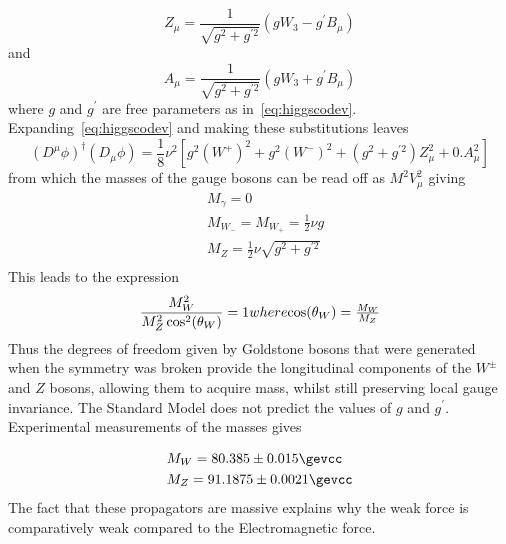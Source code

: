 \begin{equation}
  Z_{\mu} = \frac{1}{\sqrt{g^{2}+g^{\prime 2}}} (gW_{3} - g^{\prime}B_{\mu})
\end{equation}
 and
 \begin{equation}
  A_{\mu} = \frac{1}{\sqrt{g^{2}+g^{\prime 2}}} (gW_{3} + g^{\prime}B_{\mu})
\end{equation}
 where $g$ and $g^{\prime}$ are free parameters as in~\autoref{eq:higgscodev}. Expanding~\autoref{eq:higgscodev} and making these substitutions leaves
\begin{equation}
  (D^{\mu}\phi)^\dagger(D_{\mu}\phi) = \frac{1}{8}\nu^{2}[g^{2}(W^{+})^{2} + g^{2}(W^{-})^{2} + (g^{2}+g^{\prime 2})Z_{\mu}^{2} + 0.A_{\mu}^{2}] 
  \end{equation}
from which the masses of the gauge bosons can be read off as $M^{2}V_{\mu}^{2}$ giving
\begin{equation}
  \begin{split}
    &M_{\gamma} = 0\\
    &M_{W_{-}} = M_{W_{+}} = \frac{1}{2}\nu g\\
    &M_{Z} =  \frac{1}{2}\nu\sqrt{g^{2}+g^{\prime 2}} \\
  \end{split}
\end{equation}
This leads to the expression
\begin{equation}
  \frac{M_{W}^{2}}{M_{Z}^{2}\cos^{2}(\theta_{W})}  = 1 $$where$$
  \cos(\theta_{W}) =  \frac{M_{W}}{M_{Z}}
\end{equation}
Thus the degrees of freedom given by Goldstone bosons that were generated when the symmetry was broken provide the longitudinal components of the $W^{\pm}$ and $Z$ bosons, allowing them to acquire mass, whilst still preserving local gauge invariance. The Standard Model does not predict the values of $g$ and $g^{\prime}$. Experimental measurements of the masses gives

\begin{equation}
  \begin{split}
  &M_{W} = 80.385 \pm 0.015 \gevcc\\
    &M_{Z} = 91.1875 \pm 0.0021 \gevcc\\
    \end{split}
\end{equation}
The fact that these propagators are massive explains why the weak force is comparatively weak compared to the Electromagnetic force.
